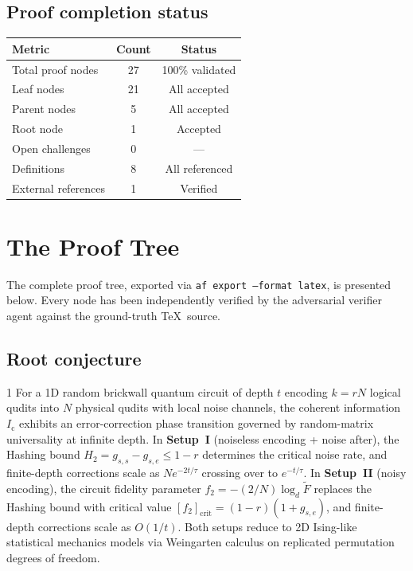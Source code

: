 \documentclass[11pt,a4paper]{article}
\newcommand{\Ic}{I_{\mathrm{c}}}
\begin{document}
\subsection{Proof completion status}

\begin{center}
\begin{tabular}{lcc}
\toprule
\textbf{Metric} & \textbf{Count} & \textbf{Status} \\
\midrule
Total proof nodes & 27 & 100\% validated \\
Leaf nodes & 21 & All accepted \\
Parent nodes & 5 & All accepted \\
Root node & 1 & Accepted \\
Open challenges & 0 & --- \\
Definitions & 8 & All referenced \\
External references & 1 & Verified \\
\bottomrule
\end{tabular}
\end{center}

\section{The Proof Tree}
\label{sec:proof_tree}

The complete proof tree, exported via \texttt{af export --format latex}, is presented below. Every node has been independently verified by the adversarial verifier agent against the ground-truth \TeX\ source.

\subsection{Root conjecture}

\begin{proofnode}{1}
For a 1D random brickwall quantum circuit of depth $t$ encoding $k=rN$ logical qudits into $N$ physical qudits with local noise channels, the coherent information $\Ic$ exhibits an error-correction phase transition governed by random-matrix universality at infinite depth. In \textbf{Setup~I} (noiseless encoding + noise after), the Hashing bound $H_2 = g_{s,s} - g_{s,e} \leq 1-r$ determines the critical noise rate, and finite-depth corrections scale as $N e^{-2t/\tau}$ crossing over to $e^{-t/\tau}$. In \textbf{Setup~II} (noisy encoding), the circuit fidelity parameter $f_2 = -(2/N)\log_d \tilde{F}$ replaces the Hashing bound with critical value $[f_2]_{\mathrm{crit}} = (1-r)(1+g_{s,e})$, and finite-depth corrections scale as $O(1/t)$. Both setups reduce to 2D Ising-like statistical mechanics models via Weingarten calculus on replicated permutation degrees of freedom.
\end{proofnode}
\end{document}
